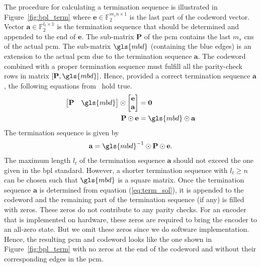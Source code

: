 The procedure for calculating a termination sequence is illustrated in Figure~\ref{fig:bpl_term} where $\mathbf{e}\in\mathbb{F}_2^{m_sn\times 1}$ is the last part of the codeword vector. Vector $\mathbf{a}\in\mathbb{F}_2^{l_t\times 1}$ is the termination sequence that should be determined and appended to the end of $\mathbf{e}$. The sub-matrix $\mathbf{P}$ of the \gls{pcm} contains the last $m_s$ \glspl{cn} of the actual \gls{pcm}. The sub-matrix $\gls{mbd}$ (containing the blue edges) is an extension to the actual \gls{pcm} due to the termination sequence $\mathbf{a}$. The codeword combined with a proper termination sequence must fulfill all the parity-check rows in matrix $[\mathbf{P},\gls{mbd}]$. Hence, provided a correct termination sequence $\mathbf{a}$, the following equations from~\cite{Chen2006} hold true.
\begin{align}
\begin{bmatrix}\mathbf{P} &\gls{mbd}\end{bmatrix}\odot
\begin{bmatrix}
\mathbf{e}\\
\mathbf{a}
\end{bmatrix}&=\mathbf{0}\\
\mathbf{P}\odot\mathbf{e}&=\gls{mbd}\odot\mathbf{a}
\end{align}
The termination sequence is given by
\begin{align}\label{eq:term_sol}
\mathbf{a}=\gls{mbd}^{-1}\odot\mathbf{P}\odot\mathbf{e}.
\end{align}
The maximum length $l_t$ of the termination sequence $\mathbf{a}$ should not exceed the one given in the \gls{bpl} standard. However, a shorter termination sequence with $l_t\geq n$ can be chosen such that $\gls{mbd}$ is a square matrix. Once the termination sequence $\mathbf{a}$ is determined from equation (\ref{eq:term_sol}), it is appended to the codeword and the remaining part of the termination sequence (if any) is filled with zeros. These zeros do not contribute to any parity checks. For an encoder that is implemented on hardware, these zeros are required to bring the encoder to an all-zero state. But we omit these zeros since we do software implementation. Hence, the resulting \gls{pcm} and codeword looks like the one shown in Figure~\ref{fig:bpl_term} with no zeros at the end of the codeword and without their corresponding edges in the \gls{pcm}.

